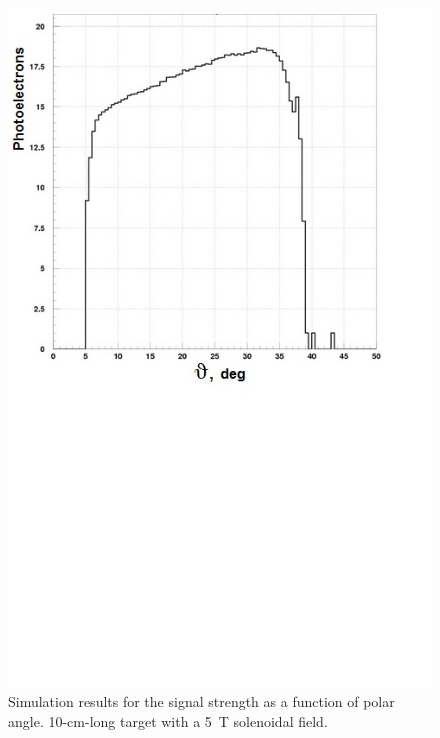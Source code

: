 \begin{figure}[!ht]
    \centering
    \includegraphics[width=1.0\linewidth,trim={0.0cm 9.4cm 0.0cm 0.0cm},clip]{images/10cm_Targ_5T_Field_Theta.jpg}
    \caption{Simulation results for the signal strength as a function of polar angle. 10-cm-long target with a 5~T
      solenoidal field.}
    \label{fig:10cm_Targ_5T_Field_Theta}
\end{figure}

